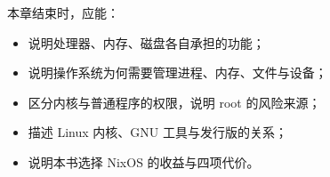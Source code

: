 \begin{checkpoint}
本章结束时，应能：
\begin{itemize}
  \item 说明处理器、内存、磁盘各自承担的功能；
  \item 说明操作系统为何需要管理进程、内存、文件与设备；
  \item 区分内核与普通程序的权限，说明 root 的风险来源；
  \item 描述 Linux 内核、GNU 工具与发行版的关系；
  \item 说明本书选择 NixOS 的收益与四项代价。
\end{itemize}
\end{checkpoint}
